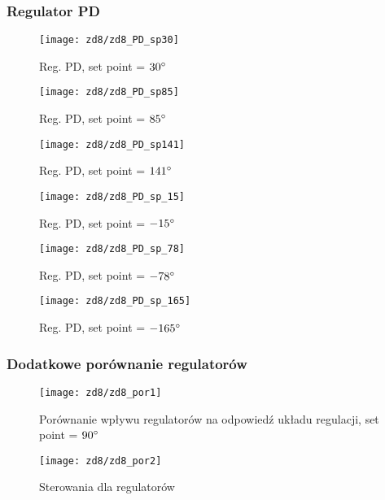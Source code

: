 \documentclass[11 pt]{article}
\begin{document}
\subsubsection*{Regulator PD}

\begin{figure}[h!]
	\centerline{
	\texttt{[image: zd8/zd8\_PD\_sp30]}
	}
	\caption{Reg. PD, set point = $30 \degree$}
\end{figure}

\begin{figure}[h!]
	\centerline{
	\texttt{[image: zd8/zd8\_PD\_sp85]}
	}
	\caption{Reg. PD, set point = $85 \degree$}
\end{figure}

\begin{figure}[h!]
	\centerline{
	\texttt{[image: zd8/zd8\_PD\_sp141]}
	}
	\caption{Reg. PD, set point = $141 \degree$}
\end{figure}

\newpage

\begin{figure}[h!]
	\centerline{
	\texttt{[image: zd8/zd8\_PD\_sp\_15]}
	}
	\caption{Reg. PD, set point = $-15\degree$}
\end{figure}

\begin{figure}[h!]
	\centerline{
	\texttt{[image: zd8/zd8\_PD\_sp\_78]}
	}
	\caption{Reg. PD, set point = $-78 \degree$}
\end{figure}

\begin{figure}[h!]
	\centerline{
	\texttt{[image: zd8/zd8\_PD\_sp\_165]}
	}
	\caption{Reg. PD, set point = $-165 \degree$}
\end{figure}

\newpage

\subsubsection*{Dodatkowe porównanie regulatorów}

\begin{figure}[h!]
	\centerline{
	\texttt{[image: zd8/zd8\_por1]}
	}
	\caption{Porównanie wpływu regulatorów na odpowiedź układu regulacji, set point = $90 \degree$}
\end{figure}

\begin{figure}[h!]
	\centerline{
	\texttt{[image: zd8/zd8\_por2]}
	}
	\caption{Sterowania dla regulatorów}
\end{figure}
\end{document}
